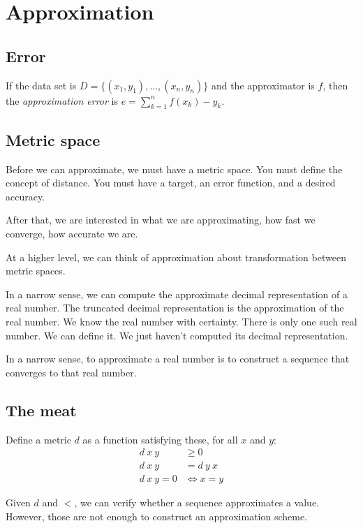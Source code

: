 \chapter{Approximation}

\section{Error}

If the data set is \(D = \{(x_1,y_1),\ldots,(x_n,y_n)\}\) and the approximator is \(f\),
then the \emph{approximation error} is \(e = \sum_{k=1}^n f(x_k) - y_k\).

\section{Metric space}

Before we can approximate, we must have a metric space.
You must define the concept of distance.
You must have a target, an error function, and a desired accuracy.

After that, we are interested in
what we are approximating, how fast we converge, how accurate we are.

At a higher level, we can think of approximation about
transformation between metric spaces.

In a narrow sense, we can compute the approximate decimal representation of a real number.
The truncated decimal representation is the approximation of the real number.
We know the real number with certainty.
There is only one such real number.
We can define it.
We just haven't computed its decimal representation.

In a narrow sense, to approximate a real number is
to construct a sequence that converges to that real number.

\section{The meat}

Define a metric \(d\) as a function satisfying these, for all \(x\) and \(y\):
\begin{align*}
    d~x~y &\ge 0
    \\
    d~x~y &= d~y~x
    \\
    d~x~y = 0 &\iff x=y
\end{align*}

Given \(d\) and \(<\), we can verify whether a sequence approximates a value.
However, those are not enough to construct an approximation scheme.


